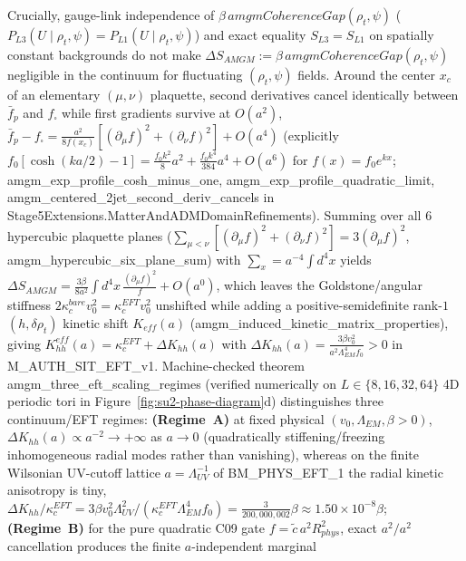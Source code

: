 \documentclass[american,11pt,letterpaper]{article}
\def\mathrm#1{#1}%
\def\texttt#1{#1}%
\def\emph#1{#1}%
\begin{document}
\begin{enumerate}[leftmargin=2em]
\end{enumerate}

Crucially, gauge-link independence of $\beta\,\mathrm{amgmCoherenceGap}(\rho_t,\psi)$ ($P_{\mathrm{L3}}(U\mid\rho_t,\psi) = P_{\mathrm{L1}}(U\mid\rho_t,\psi)$) and exact equality $S_{\mathrm{L3}} = S_{\mathrm{L1}}$ on spatially constant backgrounds do \emph{not} make $\Delta S_{\mathrm{AMGM}} := \beta\,\mathrm{amgmCoherenceGap}(\rho_t,\psi)$ negligible in the continuum for fluctuating $(\rho_t,\psi)$ fields. Around the center $x_c$ of an elementary $(\mu,\nu)$ plaquette, second derivatives cancel identically between $\bar{f}_p$ and $f_\square$ while first gradients survive at $O(a^2)$, $\bar{f}_p - f_\square = \frac{a^2}{8 f(x_c)}[(\partial_\mu f)^2 + (\partial_\nu f)^2] + O(a^4)$ (explicitly $f_0[\cosh(ka/2)-1] = \frac{f_0 k^2}{8}a^2 + \frac{f_0 k^4}{384}a^4 + O(a^6)$ for $f(x)=f_0 e^{kx}$; \texttt{amgm\_\allowbreak{}exp\_\allowbreak{}profile\_\allowbreak{}cosh\_\allowbreak{}minus\_\allowbreak{}one}, \texttt{amgm\_\allowbreak{}exp\_\allowbreak{}profile\_\allowbreak{}quadratic\_\allowbreak{}limit}, \texttt{amgm\_\allowbreak{}centered\_\allowbreak{}2jet\_\allowbreak{}second\_\allowbreak{}deriv\_\allowbreak{}cancels} in \texttt{Stage5\allowbreak{}Extensions.\allowbreak{}Matter\allowbreak{}And\allowbreak{}ADMDomain\allowbreak{}Refinements}). Summing over all $6$ hypercubic plaquette planes ($\sum_{\mu<\nu}[(\partial_\mu f)^2+(\partial_\nu f)^2] = 3(\partial_\mu f)^2$, \texttt{amgm\_\allowbreak{}hypercubic\_\allowbreak{}six\_\allowbreak{}plane\_\allowbreak{}sum}) with $\sum_x = a^{-4}\int d^4x$ yields $\Delta S_{\mathrm{AMGM}} = \frac{3\beta}{8 a^2}\int d^4x\,\frac{(\partial_\mu f)^2}{f} + O(a^0)$, which leaves the Goldstone/angular stiffness $2\kappa_c^{\mathrm{bare}}v_0^2 = \kappa_c^{\mathrm{EFT}}v_0^2$ unshifted while adding a positive-semidefinite rank-$1$ $(h,\delta\rho_t)$ kinetic shift $K_{\mathrm{eff}}(a)$ (\texttt{amgm\_\allowbreak{}induced\_\allowbreak{}kinetic\_\allowbreak{}matrix\_\allowbreak{}properties}), giving $K_{hh}^{\mathrm{eff}}(a) = \kappa_c^{\mathrm{EFT}} + \Delta K_{hh}(a)$ with $\Delta K_{hh}(a) = \frac{3\beta v_0^2}{a^2 \Lambda_{\mathrm{EM}}^4 f_0} > 0$ in \texttt{M\_AUTH\_SIT\_EFT\_v1}. Machine-checked theorem \texttt{amgm\_\allowbreak{}three\_\allowbreak{}eft\_\allowbreak{}scaling\_\allowbreak{}regimes} (verified numerically on $L\in\{8,16,32,64\}$ 4D periodic tori in Figure~\ref{fig:su2-phase-diagram}d) distinguishes three continuum/EFT regimes: \textbf{(Regime~A)} at fixed physical $(v_0,\Lambda_{\mathrm{EM}},\beta>0)$, $\Delta K_{hh}(a)\propto a^{-2}\to +\infty$ as $a\to 0$ (quadratically stiffening/freezing inhomogeneous radial modes rather than vanishing), whereas on the finite Wilsonian UV-cutoff lattice $a = \Lambda_{\mathrm{UV}}^{-1}$ of \texttt{BM\_PHYS\_EFT\_1} the radial kinetic anisotropy is tiny, $\Delta K_{hh}/\kappa_c^{\mathrm{EFT}} = 3\beta v_0^2\Lambda_{\mathrm{UV}}^2/(\kappa_c^{\mathrm{EFT}}\Lambda_{\mathrm{EM}}^4 f_0) = \frac{3}{200{,}000{,}002}\beta \approx 1.50\times 10^{-8}\beta$; \textbf{(Regime~B)} for the pure quadratic \texttt{C09} gate $f = \tilde{c}\,a^2 R_{\mathrm{phys}}^2$, exact $a^2/a^2$ cancellation produces the finite $a$-independent marginal 
\end{document}
